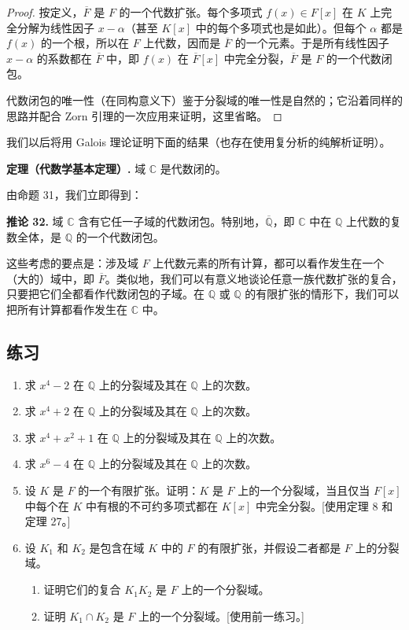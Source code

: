 \begin{proof}
	按定义，$\overline F$ 是 $F$ 的一个代数扩张。每个多项式 $f(x)\in F[x]$ 在 $K$ 上完全分解为线性因子 $x-\alpha$（甚至 $K[x]$ 中的每个多项式也是如此）。但每个 $\alpha$ 都是 $f(x)$ 的一个根，所以在 $F$ 上代数，因而是 $\overline F$ 的一个元素。于是所有线性因子 $x-\alpha$ 的系数都在 $\overline F$ 中，即 $f(x)$ 在 $\overline F[x]$ 中完全分裂，$\overline F$ 是 $F$ 的一个代数闭包。
	
	代数闭包的唯一性（在同构意义下）鉴于分裂域的唯一性是自然的；它沿着同样的思路并配合 Zorn 引理的一次应用来证明，这里省略。
\end{proof}

我们以后将用 Galois 理论证明下面的结果（也存在使用复分析的纯解析证明）。

\noindent\textbf{定理（代数学基本定理）.} 域 $\mathbb C$ 是代数闭的。


由命题 31，我们立即得到：

\noindent\textbf{推论 32.} 域 $\mathbb C$ 含有它任一子域的代数闭包。特别地，$\overline{\mathbb Q}$，即 $\mathbb C$ 中在 $\mathbb Q$ 上代数的复数全体，是 $\mathbb Q$ 的一个代数闭包。


这些考虑的要点是：涉及域 $F$ 上代数元素的所有计算，都可以看作发生在一个（大的）域中，即 $\overline F$。类似地，我们可以有意义地谈论任意一族代数扩张的复合，只要把它们全都看作代数闭包的子域。在 $\mathbb Q$ 或 $\mathbb Q$ 的有限扩张的情形下，我们可以把所有计算都看作发生在 $\mathbb C$ 中。

\subsection*{练习}

\begin{enumerate}[label=\arabic*.]
	\item 求 $x^4-2$ 在 $\mathbb Q$ 上的分裂域及其在 $\mathbb Q$ 上的次数。
	\item 求 $x^4+2$ 在 $\mathbb Q$ 上的分裂域及其在 $\mathbb Q$ 上的次数。
	\item 求 $x^4+x^2+1$ 在 $\mathbb Q$ 上的分裂域及其在 $\mathbb Q$ 上的次数。
	\item 求 $x^6-4$ 在 $\mathbb Q$ 上的分裂域及其在 $\mathbb Q$ 上的次数。
	\item 设 $K$ 是 $F$ 的一个有限扩张。证明：$K$ 是 $F$ 上的一个分裂域，当且仅当 $F[x]$ 中每个在 $K$ 中有根的不可约多项式都在 $K[x]$ 中完全分裂。[使用定理 8 和定理 27。]
	\item 设 $K_1$ 和 $K_2$ 是包含在域 $K$ 中的 $F$ 的有限扩张，并假设二者都是 $F$ 上的分裂域。
	\begin{enumerate}[label=(\alph*)]
		\item 证明它们的复合 $K_1K_2$ 是 $F$ 上的一个分裂域。
		\item 证明 $K_1\cap K_2$ 是 $F$ 上的一个分裂域。[使用前一练习。]
	\end{enumerate}
\end{enumerate}
